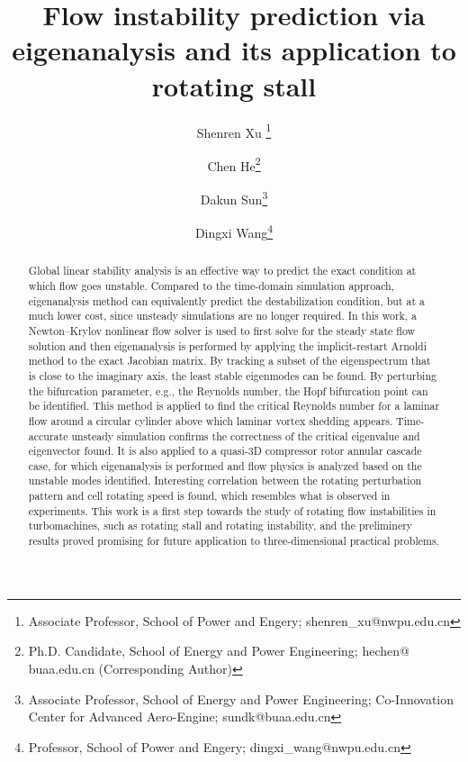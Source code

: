 \documentclass[journal,final]{new-aiaa}
\title{Flow instability prediction via eigenanalysis and its application to rotating stall}
\author[1,2]{Shenren Xu	
\footnote{Associate Professor, School of Power and Engery; shenren\_xu@nwpu.edu.cn}}
\affil[1]{Yangtze River Delta Research Institute of NPU, Northwestern Polytechnical University, Taicang~215400, P.R.~China}
\affil[2]{Northwestern Polytechnical University, Xi'an 710072, P.R.~China}
\affil[3]{Beihang University, Beijing 100191, P.R.~China}
\author[3]{Chen He\footnote{Ph.D. Candidate, School of Energy and Power Engineering; hechen@
		buaa.edu.cn (Corresponding Author) }}
\author[3]{Dakun Sun\footnote{Associate Professor, School of Energy and Power Engineering; Co-Innovation
		Center for Advanced Aero-Engine; sundk@buaa.edu.cn}}
\author[2]{Dingxi Wang\footnote{Professor, School of Power and Engery; dingxi\_wang@nwpu.edu.cn}
}
\begin{document}
\maketitle

\begin{abstract}
Global linear stability analysis is an effective way to predict the exact condition
at which flow goes unstable. Compared to the time-domain simulation approach,
eigenanalysis method can equivalently predict the destabilization
condition, but at a much lower cost, since unsteady simulations are no longer required.
In this work, a Newton--Krylov nonlinear flow solver is used to first solve for the
steady state flow solution and then eigenanalysis is performed by applying the 
implicit-restart Arnoldi method to the exact Jacobian matrix.
By tracking a subset of the eigenspectrum that is close to the imaginary axis,
the least stable eigenmodes can be found. By perturbing the bifurcation parameter,
e.g., the Reynolds number, the Hopf bifurcation point can be identified.
This method is applied to find the critical Reynolds number for a laminar
flow around a circular cylinder above which laminar vortex shedding appears.
Time-accurate unsteady simulation confirms the correctness of the critical eigenvalue
and eigenvector found. It is also applied to a quasi-3D compressor rotor
annular cascade case, for which eigenanalysis is performed and flow physics
is analyzed based on the unstable modes identified. Interesting correlation
between the rotating perturbation pattern and cell rotating speed is found,
which resembles what is observed in experiments.
This work is a first step towards the study of
rotating flow instabilities in turbomachines, such as rotating stall and rotating instability,
and the preliminery results proved promising for future
application to three-dimensional practical problems.
	
	
	

\end{abstract}
\end{document}
